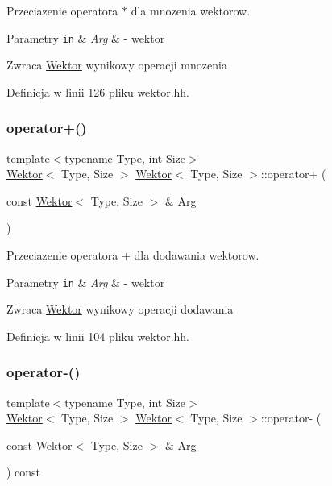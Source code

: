 Przeciazenie operatora $\ast$ dla mnozenia wektorow. 


\begin{DoxyParams}[1]{Parametry}
\mbox{\tt in}  & {\em Arg} & -\/ wektor \\
\hline
\end{DoxyParams}
\begin{DoxyReturn}{Zwraca}
\hyperlink{class_wektor}{Wektor} wynikowy operacji mnozenia 
\end{DoxyReturn}


Definicja w linii 126 pliku wektor.\+hh.

\mbox{\label{class_wektor_acfb2580d5149ebbb138b9a669b98c892}} 
\subsubsection{\texorpdfstring{operator+()}{operator+()}}
{\footnotesize\ttfamily template$<$typename Type, int Size$>$ \\
\hyperlink{class_wektor}{Wektor}$<$ Type, Size $>$ \hyperlink{class_wektor}{Wektor}$<$ Type, Size $>$\+::operator+ (\begin{DoxyParamCaption}\item[{const \hyperlink{class_wektor}{Wektor}$<$ Type, Size $>$ \&}]{Arg }\end{DoxyParamCaption})}



Przeciazenie operatora + dla dodawania wektorow. 


\begin{DoxyParams}[1]{Parametry}
\mbox{\tt in}  & {\em Arg} & -\/ wektor \\
\hline
\end{DoxyParams}
\begin{DoxyReturn}{Zwraca}
\hyperlink{class_wektor}{Wektor} wynikowy operacji dodawania 
\end{DoxyReturn}


Definicja w linii 104 pliku wektor.\+hh.

\mbox{\label{class_wektor_a8c00cfdd29bddc4115ba1285112bf62f}} 
\subsubsection{\texorpdfstring{operator-\/()}{operator-()}}
{\footnotesize\ttfamily template$<$typename Type, int Size$>$ \\
\hyperlink{class_wektor}{Wektor}$<$ Type, Size $>$ \hyperlink{class_wektor}{Wektor}$<$ Type, Size $>$\+::operator-\/ (\begin{DoxyParamCaption}\item[{const \hyperlink{class_wektor}{Wektor}$<$ Type, Size $>$ \&}]{Arg }\end{DoxyParamCaption}) const}



